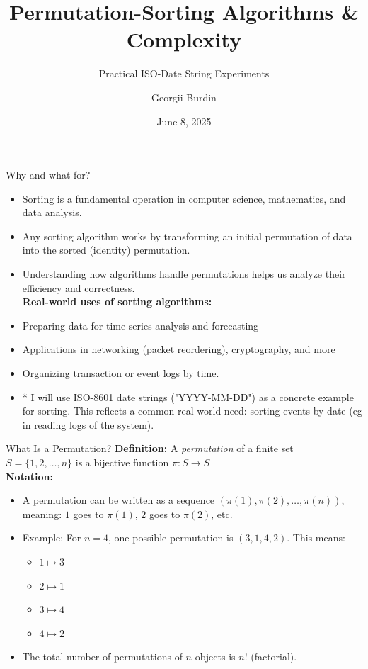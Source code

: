 \documentclass[aspectratio=169]{beamer}
\title[Permutation-Sorting \& Complexity]{Permutation-Sorting Algorithms \& Complexity}
\subtitle[ISO-Date Experiments]{Practical ISO-Date String Experiments}
\author[Georgii Burdin]{Georgii Burdin}
\institute[Fakultät CB]{Fakultät CB}
\date[June 8, 2025]{June 8, 2025}
\begin{document}
\begin{frame}{Why and what for?}
  \vspace*{-1cm}
  \begin{itemize}
    \item Sorting is a fundamental operation in computer science, mathematics, and data analysis.
    \item Any sorting algorithm works by transforming an initial permutation of data into the sorted (identity) permutation.
    \item Understanding how algorithms handle permutations helps us analyze their efficiency and correctness.\\
  \textbf{Real-world uses of sorting algorithms:}
    \item Preparing data for time-series analysis and forecasting
    \item Applications in networking (packet reordering), cryptography, and more
    \item Organizing transaction or event logs by time.
    \item * I will use ISO-8601 date strings ("YYYY-MM-DD") as a concrete example for sorting. This reflects a common real-world need: sorting events by date (eg in reading logs of the system).

\end{itemize}
\end{frame}

\begin{frame}{What Is a Permutation?}
  \vspace*{-1cm}
  \textbf{Definition:}
    A \emph{permutation} of a finite set $S = \{1,2,\dots,n\}$ is a bijective function
      $\pi: S \to S$ \\
  \textbf{Notation:}
  \begin{itemize}
    \item A permutation can be written as a sequence $(\pi(1), \pi(2), \dots, \pi(n))$,
          meaning: $1$ goes to $\pi(1)$, $2$ goes to $\pi(2)$, etc.
    \item Example: For $n=4$, one possible permutation is $(3,1,4,2)$. This means:
      \begin{itemize}
        \item $1 \mapsto 3$
        \item $2 \mapsto 1$
        \item $3 \mapsto 4$
        \item $4 \mapsto 2$
      \end{itemize}
    \item The total number of permutations of $n$ objects is $n!$ (factorial).
  \medskip
  \end{itemize}
\end{frame}
\end{document}
